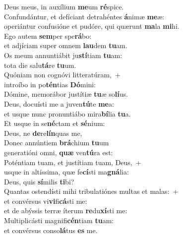 \oddverse Deus meus, in auxílium \textbf{me}um \textbf{ré}spice.\\
\evenverse Confundántur, et defíciant detrahéntes \textbf{á}nimæ \textbf{me}æ:~\*\\
\evenverse operiántur confusióne et pudóre, qui quærunt \textbf{ma}la \textbf{mi}hi.\\
\oddverse Ego autem \textbf{sem}per spe\textbf{rá}bo:~\*\\
\oddverse et adjíciam super omnem \textbf{lau}dem \textbf{tu}am.\\
\evenverse Os meum annuntiábit ju\textbf{stí}tiam \textbf{tu}am:~\*\\
\evenverse tota die salu\textbf{tá}re \textbf{tu}um.\\
\oddverse Quóniam non cognóvi litteratúram,~+\\
\oddverse  introíbo in po\textbf{tén}tias \textbf{Dó}mini:~\*\\
\oddverse Dómine, memorábor justítiæ \textbf{tu}æ so\textbf{lí}us.\\
\evenverse Deus, docuísti me a juven\textbf{tú}te \textbf{me}a:~\*\\
\evenverse et usque nunc pronuntiábo mira\textbf{bí}lia \textbf{tu}a.\\
\oddverse Et usque in se\textbf{né}ctam et \textbf{sé}nium:~\*\\
\oddverse Deus, ne \textbf{de}re\textbf{lín}quas me,\\
\evenverse Donec annúntiem \textbf{brá}chium \textbf{tu}um~\*\\
\evenverse generatióni omni, \textbf{quæ} ven\textbf{tú}ra est:\\
\oddverse Poténtiam tuam, et justítiam tuam, Deus,~+\\
\oddverse  usque in altíssima, quæ fe\textbf{cí}sti ma\textbf{gná}lia:~\*\\
\oddverse Deus, quis \textbf{sí}milis \textbf{ti}bi?\\
\evenverse Quantas ostendísti mihi tribulatiónes multas et malas:~+\\
\evenverse  et convérsus vi\textbf{vi}fi\textbf{cá}sti me:~\*\\
\evenverse et de abýssis terræ íterum \textbf{re}du\textbf{xí}sti me:\\
\oddverse Multiplicásti magnifi\textbf{cén}tiam \textbf{tu}am:~\*\\
\oddverse et convérsus conso\textbf{lá}tus \textbf{es} me.\\
